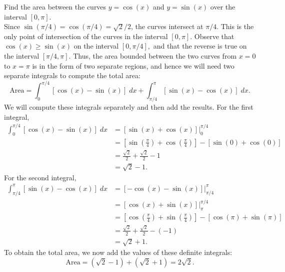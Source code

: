 \documentclass{ximera}
\begin{document}
\begin{example}[example 7]
Find the area between the curves $y = \cos(x)$ and $y=\sin(x)$ over the interval $[0, \pi]$.\\

 
Since $\sin(\pi/4) = \cos(\pi/4) = \sqrt2 / 2$, the curves intersect at $\pi/4$.  This is the only point of intersection of the curves in
the interval $[0, \pi]$. Observe that $\cos(x) \geq \sin(x)$ on the interval $[0, \pi/4],$ and
that the reverse is true on the interval $[\pi/4, \pi]$.
Thus, the area bounded between the two curves from $x = 0$ to $x = \pi$ is in the form of two separate regions, and hence 
we will need two separate integrals to compute the total area:
\[
\text{Area} = \int_0^{\pi/4} \left[\cos(x) - \sin(x)\right] \; dx + \int_{\pi/4}^\pi \left[\sin(x) -\cos(x)\right] \; dx.
\]
We will compute these integrals separately and then add the results.
For the first integral,
\begin{align*}
\int_0^{\pi/4} \left[\cos(x) - \sin(x)\right] \; dx &= \left[\sin(x) + \cos(x)\right]\bigg|_0^{\pi/4}\\
                                                    &= \left[\sin(\tfrac{\pi}{4}) + \cos(\tfrac{\pi}{4})\right]-\left[\sin(0) + \cos(0)\right]\\
                                                    &= \tfrac{\sqrt 2}{2} + \tfrac{\sqrt 2}{2} - 1\\
                                                    &= \sqrt{2} - 1.
\end{align*}
For the second integral,
\begin{align*}
\int_{\pi/4}^\pi \left[\sin(x) -\cos(x)\right] \; dx &= \left[-\cos(x) - \sin(x) \right]\bigg|_{\pi/4}^{\pi} \\
                                                     &= \left[\cos(x) + \sin(x)\right]\bigg|_{\pi}^{\pi/4}\\
                                                     &= \left[\cos(\tfrac{\pi}{4}) + \sin(\tfrac{\pi}{4})\right]-\left[\cos(\pi) + \sin(\pi)\right]\\
                                                     &= \tfrac{\sqrt 2}{2} + \tfrac{\sqrt 2}{2} - (-1)\\
                                                     &= \sqrt{2} + 1.
\end{align*}                                             
To obtain the total area, we now add the values of these definite integrals:
\[
\text{Area} = (\sqrt 2 - 1) + (\sqrt 2 + 1) = 2\sqrt{2}.
\]


\end{example}
\end{document}
